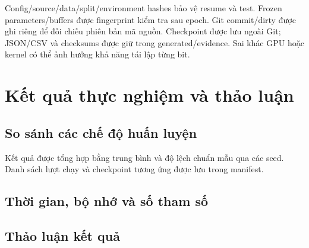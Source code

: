 \documentclass[12pt,a4paper]{report}
\numberwithin{equation}{chapter}
\begin{document}
Config/source/data/split/environment hashes bảo vệ resume và test. Frozen
parameters/buffers được fingerprint kiểm tra sau epoch. Git commit/dirty
được ghi riêng để đối chiếu phiên bản mã nguồn. Checkpoint được lưu ngoài
Git; JSON/CSV và checksums được giữ trong generated/evidence. Sai khác
GPU hoặc kernel có thể ảnh hưởng khả năng tái lập từng bit.

\chapter{Kết quả thực nghiệm và thảo luận}
\section{So sánh các chế độ huấn luyện}
\begin{table}[htbp]\centering\small
\setlength{\tabcolsep}{5pt}

\caption{Accuracy và macro-F1 của tám cấu hình, trung bình và SD mẫu qua ba seed. Accuracy theo phần trăm, F1 theo thang 0--1.}
\end{table}
Kết quả được tổng hợp bằng trung bình và độ lệch chuẩn mẫu qua các seed.
Danh sách lượt chạy và checkpoint tương ứng được lưu trong manifest.

\section{Thời gian, bộ nhớ và số tham số}
\begin{table}[htbp]\centering\small
\setlength{\tabcolsep}{4pt}

\caption{Tổng tham số và tham số được học theo triệu (M); thời gian train đủ 20 epoch; peak allocated memory trung bình theo MiB. Phạm vi phép đo ở Mục 3.3.}
\end{table}

\section{Thảo luận kết quả}

\end{document}
